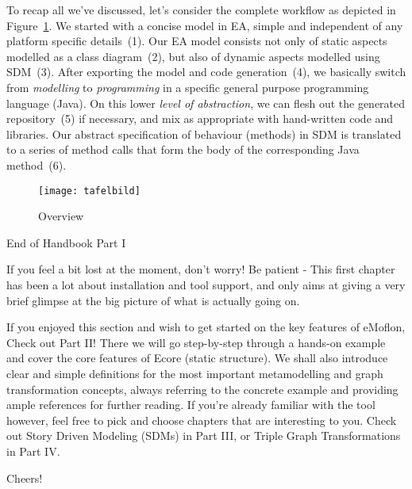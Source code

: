 To recap all we've discussed, let's consider the complete workflow as depicted in Figure~\ref{fig_Overview}. 
We started with a concise model in EA, simple and independent of any platform specific details~(1).  
Our EA model consists not only of static aspects modelled as a class diagram~(2), but also of dynamic
aspects modelled using SDM~(3).  After exporting the model and code generation~(4), we basically switch from \emph{modelling} to \emph{programming} in a specific general purpose programming language (Java).  
On this lower \emph{level of abstraction}, we can flesh out the generated repository~(5) if necessary, and mix as appropriate with hand-written code and libraries.  Our abstract specification of behaviour (methods) in SDM is translated to a series of method calls that form the body of the corresponding Java method~(6).

\vspace{1cm}

\begin{figure}[htbp]
	\centering
  \texttt{[image: tafelbild]}
	\caption{Overview}
	\label{fig_Overview}
\end{figure}


\newpage
\noHeader

End of Handbook Part I

If you feel a bit lost at the moment, don't worry! Be patient - This first chapter has been a lot about installation and tool support, and only aims at giving a very brief glimpse at the big picture of what is actually going on.    

If you enjoyed this section and wish to get started on the key features of eMoflon, Check out Part II! There we will go step-by-step through a hands-on example and cover the core features of Ecore (static structure). %
We shall also introduce clear and simple definitions for the most important metamodelling and graph transformation concepts, always referring to the concrete example and providing ample references for further reading.
If you're already familiar with the tool however, feel free to pick and choose chapters that are interesting to you. Check out Story Driven Modeling (SDMs) in Part III, or Triple Graph Transformations in Part IV. 

Cheers!